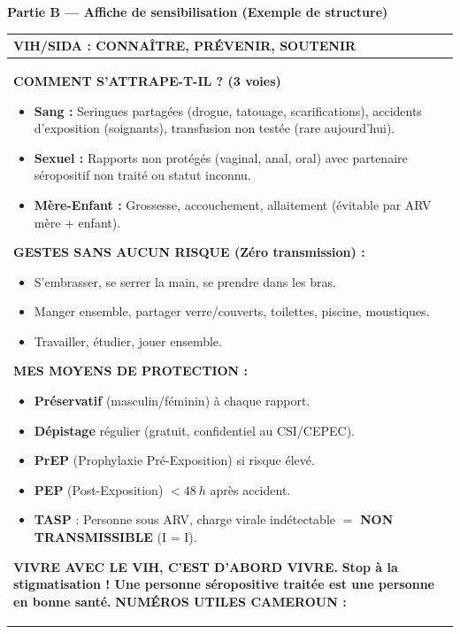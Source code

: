 \documentclass[11pt]{article}
\begin{document}
\begin{exoresolu}
\textbf{Partie B — Affiche de sensibilisation (Exemple de structure)}
\begin{center}
\begin{tabularx}{\linewidth}{|X|}\hline
\rowcolor{popblueL} \textbf{\Large \textsc{VIH/SIDA : CONNAÎTRE, PRÉVENIR, SOUTENIR}} \\ \hline
\begin{minipage}{\linewidth}
\textbf{COMMENT S'ATTRAPE-T-IL ? (3 voies)}
\begin{itemize}
    \item \textcolor{popred}{\textbf{Sang :}} Seringues partagées (drogue, tatouage, scarifications), accidents d'exposition (soignants), transfusion non testée (rare aujourd'hui).
    \item \textcolor{popred}{\textbf{Sexuel :}} Rapports non protégés (vaginal, anal, oral) avec partenaire séropositif non traité ou statut inconnu.
    \item \textcolor{popred}{\textbf{Mère-Enfant :}} Grossesse, accouchement, allaitement (évitable par ARV mère + enfant).
\end{itemize}
\textbf{GESTES SANS AUCUN RISQUE (Zéro transmission) :}
\begin{itemize}
    \item S'embrasser, se serrer la main, se prendre dans les bras.
    \item Manger ensemble, partager verre/couverts, toilettes, piscine, moustiques.
    \item Travailler, étudier, jouer ensemble.
\end{itemize}
\textbf{MES MOYENS DE PROTECTION :}
\begin{itemize}
    \item \textbf{Préservatif} (masculin/féminin) à chaque rapport.
    \item \textbf{Dépistage} régulier (gratuit, confidentiel au CSI/CEPEC).
    \item \textbf{PrEP} (Prophylaxie Pré-Exposition) si risque élevé.
    \item \textbf{PEP} (Post-Exposition) $< \SI{48}{h}$ après accident.
    \item \textbf{TASP} : Personne sous ARV, charge virale indétectable $=$ \textbf{NON TRANSMISSIBLE} (I = I).
\end{itemize}
\textbf{\textcolor{popgreen}{VIVRE AVEC LE VIH, C'EST D'ABORD VIVRE.}}
\textbf{Stop à la stigmatisation ! Une personne séropositive traitée est une personne en bonne santé.}
\vspace{0.5em}
\textbf{NUMÉROS UTILES CAMEROUN :}

\end{minipage}
\end{tabularx}
\end{center}
\end{exoresolu}
\end{document}
